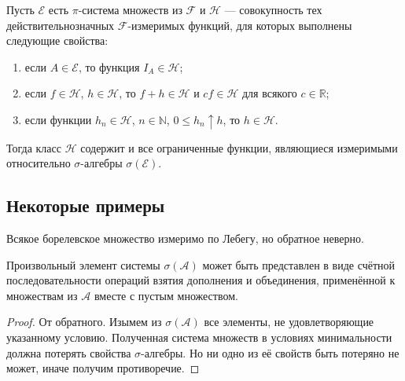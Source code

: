 \begin{theorem}
  Пусть $ \mathscr E $ есть $ \pi $-система множеств из $ \mathscr F $ и $
  \mathscr H $ --- совокупность тех действительнозначных $ \mathscr F
  $-измеримых функций, для которых выполнены следующие свойства:
  \begin{enumerate}
    \item если $ A \in \mathscr E $, то функция $ I_A \in \mathscr H $;
    \item если $ f \in \mathscr H $, $ h \in \mathscr H $, то $ f + h \in
      \mathscr H $ и $ cf \in \mathscr H $ для всякого $ c \in \mathbb R $;
    \item если функции $ h_n \in \mathscr H $, $ n \in \mathbb N $, $ 0
      \leqslant h_n \uparrow h $, то $ h \in \mathscr H $.
  \end{enumerate}
      Тогда класс $ \mathscr H $ содержит и все ограниченные функции, являющиеся
      измеримыми относительно $ \sigma $-алгебры $ \sigma(\mathscr E) $.
\end{theorem} %


\subsection{Некоторые примеры}
Всякое борелевское множество измеримо по Лебегу, но обратное неверно.

\begin{lemma}
Произвольный элемент системы $ \sigma(\mathscr A) $ может быть представлен в
виде счётной последовательности операций взятия дополнения и объединения,
применённой к множествам из $ \mathscr A $ вместе с пустым множеством. 
\end{lemma}
\begin{proof}
От обратного. Изымем из $ \sigma(\mathscr A) $ все элементы, не удовлетворяющие
указанному условию. Полученная система множеств в условиях минимальности должна
потерять свойства $ \sigma $-алгебры. Но ни одно из её свойств быть потеряно не
может, иначе получим противоречие.
\end{proof}

